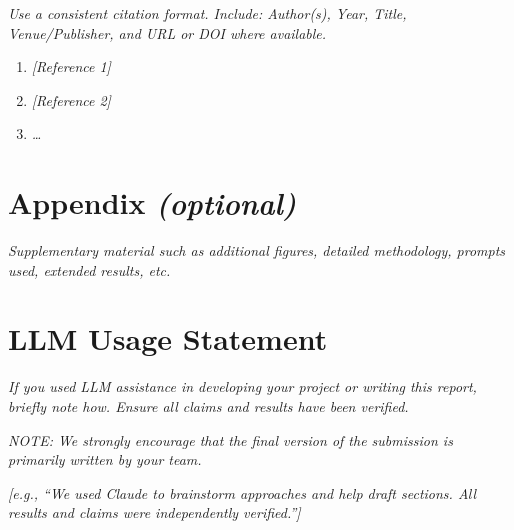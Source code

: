\documentclass[11pt,letterpaper]{article}
\newcommand{\guide}[1]{\textit{#1}}
\begin{document}
\guide{Use a consistent citation format. Include: Author(s), Year, Title,
Venue/Publisher, and URL or DOI where available.}

\begin{enumerate}
  \item \guide{[Reference 1]}
  \item \guide{[Reference 2]}
  \item \guide{\ldots}
\end{enumerate}

% 
% 

\section*{Appendix \textit{(optional)}}

\guide{Supplementary material such as additional figures, detailed methodology,
prompts used, extended results, etc.}

\section*{LLM Usage Statement}

\guide{If you used LLM assistance in developing your project or writing this
report, briefly note how. Ensure all claims and results have been verified.}

\guide{NOTE: We strongly encourage that the final version of the submission is
primarily written by your team.}

\guide{[e.g., ``We used Claude to brainstorm approaches and help draft sections.
All results and claims were independently verified.'']}
\end{document}
